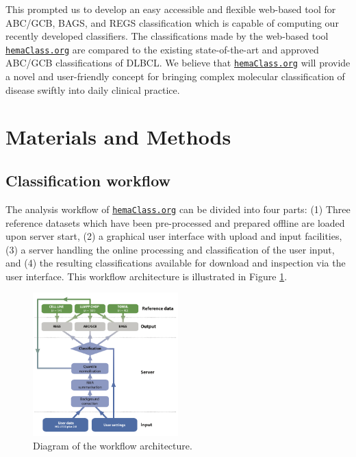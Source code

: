 \documentclass{article}
\newcommand{\hemaClass}{\href{http://hemaClass.org}{\texttt{hemaClass.org}}}
\begin{document}
This prompted us to develop an easy accessible and flexible web-based tool for ABC/GCB, BAGS, and REGS classification which is capable of computing our recently developed classifiers.
The classifications made by the web-based tool \hemaClass{} are compared to the existing state-of-the-art and approved ABC/GCB classifications of DLBCL.
We believe that \hemaClass{} will provide a novel and user-friendly concept for bringing complex molecular classification of disease swiftly into daily clinical practice.


\section{Materials and Methods}

\subsection{Classification workflow}
The analysis workflow of \hemaClass{} can be divided into four parts:
(1) Three reference datasets which have been pre-processed and prepared offline are loaded upon server start,
(2) a graphical user interface with upload and input facilities,
(3) a server handling the online processing and classification of the user input, and
(4) the resulting classifications available for download and inspection via the user interface.
This workflow architecture is illustrated in Figure \ref{fig:webtooldiagram}.

\begin{figure}
\begin{center}
\includegraphics[width=0.5\textwidth]{figures/Flowchart6.pdf}
\end{center}
\caption{Diagram of the workflow architecture.}
\label{fig:webtooldiagram}
\end{figure}
\end{document}
